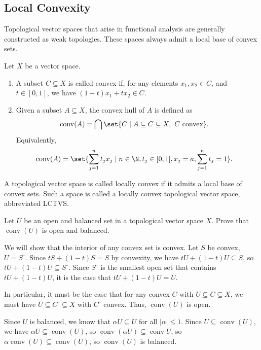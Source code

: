 \documentclass[10pt]{mypackage}
\DeclareMathOperator{\conv}{conv}
\begin{document}
\subsection{Local Convexity}%
Topological vector spaces that arise in functional analysis are generally constructed as weak topologies. These spaces always admit a local base of convex sets.
\begin{definition}
  Let $X$ be a vector space.
  \begin{enumerate}[(1)]
    \item A subset $C\subseteq X$ is called convex if, for any elements $x_1,x_2\in C$, and $t\in [0,1]$, we have $\left(1-t\right)x_1 + tx_2\in C$.
    \item Given a subset $A\subseteq X$, the convex hull of $A$ is defined as
      \begin{align*}
        \conv(A) &= \bigcap\set{C\mid A\subseteq C\subseteq X,~C\text{ convex}}.
      \end{align*}
      Equivalently,
      \begin{align*}
        \conv(A) &= \set{\sum_{j=1}^{n}t_jx_j\mid n\in\N,t_j\in [0,1],x_j=a,\sum_{j=1}^{n}t_j = 1}.
      \end{align*}
  \end{enumerate}
\end{definition}
\begin{definition}
  A topological vector space is called locally convex if it admits a local base of convex sets. Such a space is called a locally convex topological vector space, abbreviated LCTVS.
\end{definition}
\begin{exercise}
  Let $U$ be an open and balanced set in a topological vector space $X$. Prove that $\conv(U)$ is open and balanced.
\end{exercise}
\begin{solution}
  We will show that the interior of any convex set is convex. Let $S$ be convex, $U = S^{\circ}$. Since $tS + \left(1-t\right)S = S$ by convexity, we have $tU + \left(1-t\right)U \subseteq S$, so $tU + \left(1-t\right)U \subseteq S^{\circ}$. Since $S^{\circ}$ is the smallest open set that contains $tU + \left(1-t\right)U$, it is the case that $tU + \left(1-t\right)U = U$.\newline

  In particular, it must be the case that for any convex $C$ with $U\subseteq C\subseteq X$, we must have $U\subseteq C^{\circ}\subseteq X$ with $C^{\circ}$ convex. Thus, $\conv(U)$ is open.\newline

  Since $U$ is balanced, we know that $\alpha U\subseteq U$ for all $\left\vert \alpha \right\vert \leq 1$. Since $U\subseteq \conv(U)$, we have $\alpha U \subseteq \conv(U)$, so $\conv(\alpha U) \subseteq \conv U$, so $\alpha \conv(U) \subseteq \conv(U)$, so $\conv(U)$ is balanced.
\end{solution}
\end{document}
